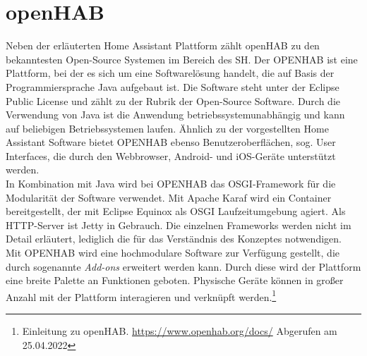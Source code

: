 \section{openHAB}
\label{sec:openhab} 
    Neben der erläuterten Home Assistant Plattform zählt openHAB zu den bekanntesten Open-Source Systemen im 
    Bereich des \acs{SH}. Der \ac{OPENHAB} ist eine Plattform, bei der es sich um eine 
    Softwarelösung handelt, die auf Basis der Programmiersprache Java aufgebaut ist. Die Software steht unter 
    der Eclipse Public License und zählt zu der Rubrik der Open-Source Software. Durch die Verwendung 
    von Java ist die Anwendung betriebssystemunabhängig und kann auf beliebigen Betriebssystemen laufen. 
    Ähnlich zu der vorgestellten Home Assistant Software bietet \acs{OPENHAB} ebenso Benutzeroberflächen, sog. User Interfaces, die durch 
    den Webbrowser, Android- und iOS-Geräte unterstützt werden. 
    \\
    \linebreak
    In Kombination mit Java wird bei \acs{OPENHAB} das \ac{OSGI}-Framework für die Modularität der Software verwendet. Mit Apache 
    Karaf wird ein Container bereitgestellt, der mit Eclipse Equinox als \acs{OSGI} Laufzeitumgebung agiert. Als 
    \acs{HTTP}-Server ist Jetty in Gebrauch. Die einzelnen Frameworks werden nicht im Detail erläutert, lediglich die für das 
    Verständnis des Konzeptes notwendigen.
    \\
    \linebreak
    Mit \acs{OPENHAB} wird eine hochmodulare Software zur Verfügung gestellt, die durch sogenannte \textit{Add-ons} erweitert 
    werden kann. Durch diese wird der Plattform eine breite Palette an Funktionen geboten. Physische Geräte können in 
    großer Anzahl mit der Plattform interagieren und verknüpft werden.\footnote{Einleitung zu openHAB. \url{https://www.openhab.org/docs/} Abgerufen am 25.04.2022}
